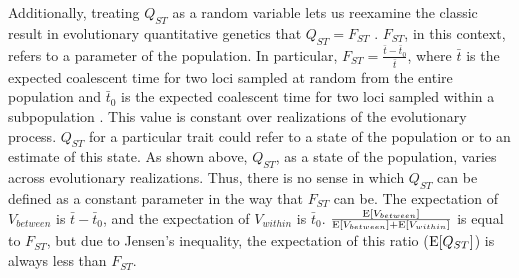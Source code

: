 Additionally, treating $Q_{ST}$ as a random variable lets us reexamine the
classic result in evolutionary quantitative genetics that $Q_{ST}=F_{ST}$
\citep{Whitlock1999}. $F_{ST}$, in this context, refers to a parameter of the
population. In particular, $F_{ST} = \frac{\bar{t} - \bar{t}_0}{\bar{t}}$, where
$\bar{t}$ is the expected coalescent time for two loci sampled at random from
the entire population and $\bar{t}_0$ is the expected coalescent time for two
loci sampled within a subpopulation \citep{Slatkin1991}. This value is constant
over realizations of the evolutionary process. $Q_{ST}$ for a particular trait
could refer to a state of the population or to an estimate of this state. As
shown above, $Q_{ST}$, as a state of the population, varies across evolutionary
realizations. Thus, there is no sense in which $Q_{ST}$ can be defined as a
constant parameter in the way that $F_{ST}$ can be. The expectation of
$V_{between}$ is $\bar{t} - \bar{t}_0$, and the expectation of $V_{within}$ is
$\bar{t}_0$. $\frac{\mathrm{E}[V_{between}]}{\mathrm{E}[V_{between}] + \mathrm{E}[V_{within}]}$ is equal
to $F_{ST}$, but due to Jensen's inequality, the expectation of this ratio
($\mathrm{E}[Q_{ST}]$) is always less than $F_{ST}$.

